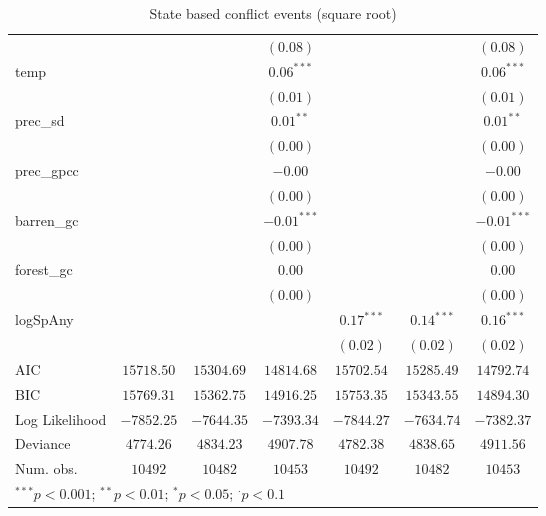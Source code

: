 \begin{sidewaystable}
\begin{center}
{\begin{tabular}{l c c c c c c}
                &               &                & $(0.08)$      &               &                & $(0.08)$      \\
temp            &               &                & $0.06^{***}$  &               &                & $0.06^{***}$  \\
                &               &                & $(0.01)$      &               &                & $(0.01)$      \\
prec\_sd        &               &                & $0.01^{**}$   &               &                & $0.01^{**}$   \\
                &               &                & $(0.00)$      &               &                & $(0.00)$      \\
prec\_gpcc      &               &                & $-0.00$       &               &                & $-0.00$       \\
                &               &                & $(0.00)$      &               &                & $(0.00)$      \\
barren\_gc      &               &                & $-0.01^{***}$ &               &                & $-0.01^{***}$ \\
                &               &                & $(0.00)$      &               &                & $(0.00)$      \\
forest\_gc      &               &                & $0.00$        &               &                & $0.00$        \\
                &               &                & $(0.00)$      &               &                & $(0.00)$      \\
logSpAny        &               &                &               & $0.17^{***}$  & $0.14^{***}$   & $0.16^{***}$  \\
                &               &                &               & $(0.02)$      & $(0.02)$       & $(0.02)$      \\
\hline
AIC             & $15718.50$    & $15304.69$     & $14814.68$    & $15702.54$    & $15285.49$     & $14792.74$    \\
BIC             & $15769.31$    & $15362.75$     & $14916.25$    & $15753.35$    & $15343.55$     & $14894.30$    \\
Log Likelihood  & $-7852.25$    & $-7644.35$     & $-7393.34$    & $-7844.27$    & $-7634.74$     & $-7382.37$    \\
Deviance        & $4774.26$     & $4834.23$      & $4907.78$     & $4782.38$     & $4838.65$      & $4911.56$     \\
Num. obs.       & $10492$       & $10482$        & $10453$       & $10492$       & $10482$        & $10453$       \\
\hline
\multicolumn{7}{l}{\scriptsize{$^{***}p<0.001$; $^{**}p<0.01$; $^{*}p<0.05$; $^{\cdot}p<0.1$}}
\end{tabular}
}
\caption{State based conflict events (square root)}
\label{sqrtState_based}
\end{center}
\end{sidewaystable}

